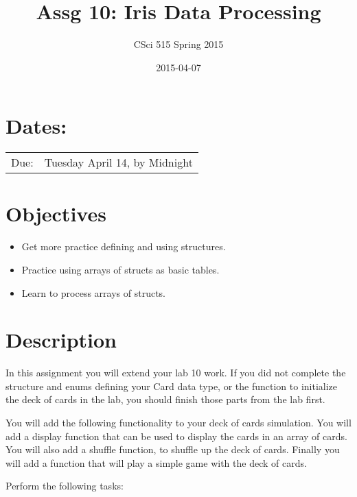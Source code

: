 \documentclass[11pt]{article}
\title{Assg 10: Iris Data Processing}
\author{CSci 515 Spring 2015}
\date{2015-04-07}
\begin{document}
\maketitle


\section*{Dates:}
\label{sec-1}


\begin{center}
\begin{tabular}{ll}
 Due:  &  Tuesday April 14, by Midnight  \\
\end{tabular}
\end{center}
\section*{Objectives}
\label{sec-2}

\begin{itemize}
\item Get more practice defining and using structures.
\item Practice using arrays of structs as basic tables.
\item Learn to process arrays of structs.
\end{itemize}
\section*{Description}
\label{sec-3}

In this assignment you will extend your lab 10 work.  If you did not
complete the structure and enums defining your Card data type, or the
function to initialize the deck of cards in the lab, you should finish
those parts from the lab first.

You will add the following functionality to your deck of cards
simulation.  You will add a display function that can be used to
display the cards in an array of cards.  You will also add a shuffle
function, to shuffle up the deck of cards.  Finally you will add
a function that will play a simple game with the deck of cards.

Perform the following tasks:
\end{document}
